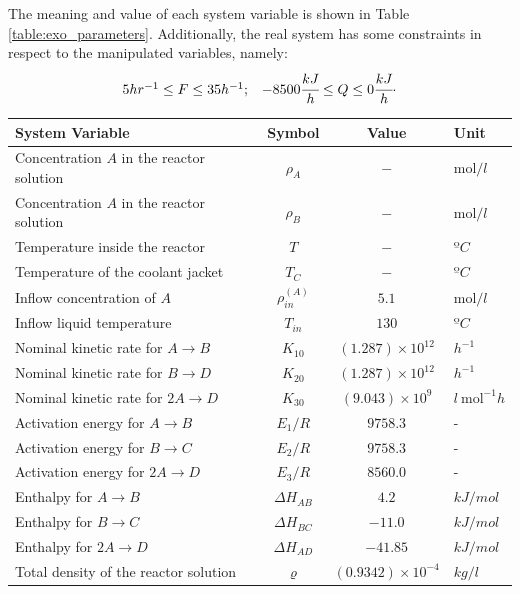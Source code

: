 \documentclass[a4paper,11pt]{book}
\numberwithin{figure}{chapter}
\numberwithin{equation}{chapter}
\numberwithin{table}{chapter}
\theoremstyle{definition}
\begin{document}
The meaning and value of each system variable is shown in Table \ref{table:exo_parameters}. Additionally, the real system has some constraints in respect to the manipulated variables, namely:
\begin{equation}
\begin{matrix}
	5 hr^{-1} \leq F \leq 35 h^{-1}; & -8500 \cfrac{kJ}{h} \leq Q \leq 0 \cfrac{kJ}{h}
\end{matrix}
.\end{equation}

\begin{table}[ht]
  \centering
	\begin{tabular}{l | c | c l }
	\textbf{System Variable} & \textbf{Symbol} & \textbf{Value} & \textbf{Unit} \\
	\hline
	Concentration $A$ in the reactor solution & $\rho_A$ 	& $-$		& $\text{mol}/l$ \\
	Concentration $A$ in the reactor solution & $\rho_B$ 	& $-$		& $\text{mol}/l$ \\
	Temperature inside the reactor & $T$ 	& $-$		& $º C$ \\
	Temperature of the coolant jacket & $T_C$ 	& $-$		& $º C$ \\
	\hline
	Inflow concentration of $A$ & $\rho^{(A)}_{in}$ 	& $5.1$		& $\text{mol}/l$ \\
	Inflow liquid temperature & $T_{in}$ 	& $130$		& $º C$ \\
	Nominal kinetic rate for $A \rightarrow B$ & $K_{10}$	& $(1.287)\times 10^{12}$	& $h^{-1}$ \\
	Nominal kinetic rate for $B \rightarrow D$ & $K_{20}$	& $(1.287)\times 10^{12}$	& $h^{-1}$ \\
	Nominal kinetic rate for $2A \rightarrow D$ & $K_{30}$	& $(9.043)\times 10^{9}$	& $l\  \text{mol}^{-1} h $ \\
	Activation energy for $A \rightarrow B$ & $E_{1}/R$	& $9758.3$	& - \\
	Activation energy for $B \rightarrow C$ & $E_{2}/R$	& $9758.3$	& - \\
	Activation energy for $2A \rightarrow D$ & $E_{3}/R$	& $8560.0$	& - \\
	Enthalpy for $A \rightarrow B$ & $\Delta H_{AB}$	& $4.2$	& $kJ/mol$ \\
	Enthalpy for $B \rightarrow C$ & $\Delta H_{BC}$	& $-11.0$	& $kJ/mol$ \\
	Enthalpy for $2A \rightarrow D$ & $\Delta H_{AD}$	& $-41.85$	& $kJ/mol$ \\
	Total density of the reactor solution & $\varrho$ & $(0.9342)\times 10^{-4}$ & $kg/l$ \\

\end{tabular}
\end{table}
\end{document}
